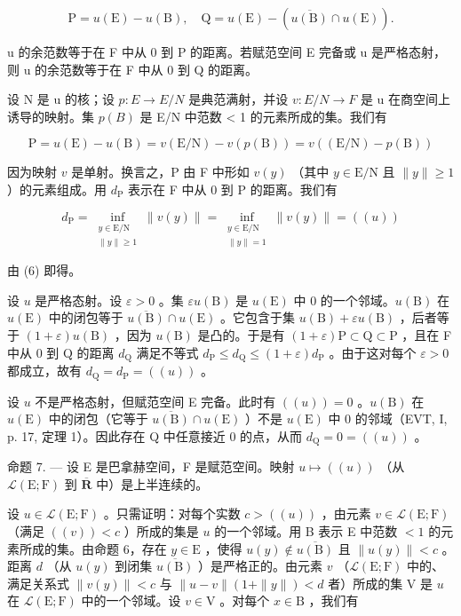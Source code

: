 \[
\mathrm{P} = u (\mathrm{E}) - u (\mathrm{B}), \quad \mathrm{Q} = u (\mathrm{E}) - (\overline {{u (\mathrm{B})}} \cap u (\mathrm{E})).
\]

u 的余范数等于在 F 中从 0 到 P 的距离。若赋范空间 E 完备或 u 是严格态射，则 u 的余范数等于在 F 中从 0 到 Q 的距离。

设 N 是 u 的核；设 \(p: E \to E/N\) 是典范满射，并设 \(v: E/N \to F\) 是 u 在商空间上诱导的映射。集 \(p(B)\) 是 E/N 中范数 \textless{} 1 的元素所成的集。我们有

\[
\mathrm{P} = u (\mathrm{E}) - u (\mathrm{B}) = v (\mathrm{E} / \mathrm{N}) - v (p (\mathrm{B})) = v ((\mathrm{E} / \mathrm{N}) - p (\mathrm{B}))
\]

因为映射 \(v\) 是单射。换言之，P 由 F 中形如 \(v(y)\) （其中 \(y \in \mathrm{E/N}\) 且 \(\|y\| \geqslant 1\) ）的元素组成。用 \(d_{\mathrm{P}}\) 表示在 F 中从 0 到 P 的距离。我们有

\[
d_{\mathrm{P}} = \inf_{\substack{y\in \mathrm{E} / \mathrm{N}\\ \| y\| \geqslant 1}}\| v(y)\| = \inf_{\substack{y\in \mathrm{E} / \mathrm{N}\\ \| y\| = 1}}\| v(y)\| = ((u))
\]

由 (6) 即得。

设 \(u\) 是严格态射。设 \(\varepsilon > 0\) 。集 \(\varepsilon u(\mathrm{B})\) 是 \(u(\mathrm{E})\) 中 0 的一个邻域。\(u(\mathrm{B})\) 在 \(u(\mathrm{E})\) 中的闭包等于 \(\overline{u(\mathrm{B})} \cap u(\mathrm{E})\) 。它包含于集 \(u(\mathrm{B}) + \varepsilon u(\mathrm{B})\) ，后者等于 \((1 + \varepsilon)u(\mathrm{B})\) ，因为 \(u(\mathrm{B})\) 是凸的。于是有 \((1 + \varepsilon)\mathrm{P} \subset \mathrm{Q} \subset \mathrm{P}\) ，且在 F 中从 0 到 Q 的距离 \(d_{\mathrm{Q}}\) 满足不等式 \(d_{\mathrm{P}} \leqslant d_{\mathrm{Q}} \leqslant (1 + \varepsilon)d_{\mathrm{P}}\) 。由于这对每个 \(\varepsilon > 0\) 都成立，故有 \(d_{\mathrm{Q}} = d_{\mathrm{P}} = ((u))\) 。

设 \(u\) 不是严格态射，但赋范空间 E 完备。此时有 \(((u)) = 0\) 。\(u(\mathrm{B})\) 在 \(u(\mathrm{E})\) 中的闭包（它等于 \(\overline{u(\mathrm{B})} \cap u(\mathrm{E})\) ）不是 \(u(\mathrm{E})\) 中 0 的邻域（EVT, I, p. 17, 定理 1）。因此存在 Q 中任意接近 0 的点，从而 \(d_{\mathrm{Q}} = 0 = ((u))\) 。

命题 7. --- 设 E 是巴拿赫空间，F 是赋范空间。映射 \(u \mapsto ((u))\) （从 \(\mathcal{L}(\mathrm{E};\mathrm{F})\) 到 \(\overline{\mathbf{R}}\) 中）是上半连续的。

设 \(u \in \mathcal{L}(\mathrm{E};\mathrm{F})\) 。只需证明：对每个实数 \(c > ((u))\) ，由元素 \(v \in \mathcal{L}(\mathrm{E};\mathrm{F})\) （满足 \(((v)) < c\) ）所成的集是 \(u\) 的一个邻域。用 B 表示 E 中范数 \(< 1\) 的元素所成的集。由命题 6，存在 \(y \in \mathrm{E}\) ，使得 \(u(y) \notin \overline{u(\mathrm{B})}\) 且 \(\| u(y)\| < c\) 。距离 \(d\) （从 \(u(y)\) 到闭集 \(\overline{u(\mathrm{B})}\) ）是严格正的。由元素 \(v\) （\(\mathcal{L}(\mathrm{E};\mathrm{F})\) 中的、满足关系式 \(\| v(y)\| < c\) 与 \(\| u - v\|(1 + \| y\|) < d\) 者）所成的集 V 是 \(u\) 在 \(\mathcal{L}(\mathrm{E};\mathrm{F})\) 中的一个邻域。设 \(v \in \mathrm{V}\) 。对每个 \(x \in \mathrm{B}\) ，我们有

